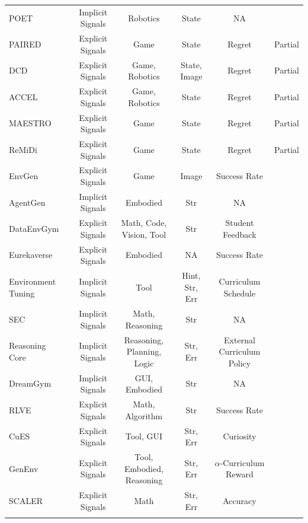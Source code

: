 \documentclass{llmxive}
\providecommand{\Yes}{\ding{51}}
\providecommand{\No}{\ding{55}}
\begin{document}
\begin{table}
{\begin{tabular}{lccccc}
POET~\cite{POET} & Implicit Signals & Robotics & State & NA & \Yes \\
PAIRED~\cite{PAIRED} & Explicit Signals & Game & State & Regret & Partial \\
DCD~\cite{DCD} & Explicit Signals & Game, Robotics & State, Image & Regret & Partial \\
ACCEL~\cite{ACCEL} & Explicit Signals & Game, Robotics & State & Regret & Partial \\
MAESTRO~\cite{MAESTRO} & Explicit Signals & Game & State & Regret & Partial \\
ReMiDi~\cite{ReMiDi} & Explicit Signals & Game & State & Regret & Partial \\
EnvGen~\cite{EnvGen} & Explicit Signals & Game & Image & Success Rate & \No \\
AgentGen~\cite{AgentGen} & Implicit Signals & Embodied & Str & NA & \No \\
DataEnvGym~\cite{DataEnvGym} & Explicit Signals & Math, Code, Vision, Tool & Str & Student Feedback & \No \\
Eurekaverse~\cite{Eurekaverse} & Explicit Signals & Embodied & NA & Success Rate & \Yes \\
Environment Tuning~\cite{Environment_Tuning} & Implicit Signals & Tool & Hint, Str, Err & Curriculum Schedule & \Yes \\
SEC~\cite{SEC} & Implicit Signals & Math, Reasoning & Str & NA & \No \\
Reasoning Core~\cite{Reasoning_Core} & Implicit Signals & Reasoning, Planning, Logic & Str, Err & External Curriculum Policy & \No \\
DreamGym~\cite{DreamGym} & Implicit Signals & GUI, Embodied & Str & NA & \No \\
RLVE~\cite{RLVE} & Explicit Signals & Math, Algorithm & Str & Success Rate & \No \\
CuES~\cite{CuES} & Explicit Signals & Tool, GUI & Str, Err & Curiosity & \No \\
GenEnv~\cite{GenEnv} & Explicit Signals & Tool, Embodied, Reasoning & Str, Err & $\alpha$-Curriculum Reward & \No \\
SCALER~\cite{SCALER} & Explicit Signals & Math & Str, Err & Accuracy & \No \\

\midrule
\rowcolor{gray!10!white}
\multicolumn{6}{c}{\textbf{\textit{Scaling-Driven Evolution (\cref{sec:scaling_evo})}}} \\


\end{tabular}}
\end{table}
\end{document}

